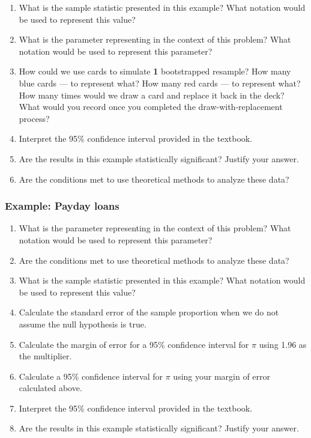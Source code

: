 \documentclass[
]{report}
\newcommand{\rgs}{\vspace{12pt}} %
\begin{document}
\begin{enumerate}
\def\labelenumi{\arabic{enumi}.}
\item
  What is the sample statistic presented in this example? What notation would be used to represent this value?
  \rgs
\item
  What is the parameter representing in the context of this problem? What notation would be used to represent this parameter?
  \rgs
\item
  How could we use cards to simulate \textbf{1} bootstrapped resample? How many blue cards --- to represent what? How many red cards --- to represent what? How many times would we draw a card and replace it back in the deck? What would you record once you completed the draw-with-replacement process?
  \rgs
  \rgs
\item
  Interpret the 95\% confidence interval provided in the textbook.
  \rgs
\item
  Are the results in this example statistically significant? Justify your answer.
  \rgs
\item
  Are the conditions met to use theoretical methods to analyze these data?
  \rgs
\end{enumerate}

\hypertarget{example-payday-loans-1}{%
\subsubsection*{Example: Payday loans}\label{example-payday-loans-1}}

\begin{enumerate}
\def\labelenumi{\arabic{enumi}.}
\item
  What is the parameter representing in the context of this problem? What notation would be used to represent this parameter?
  \rgs
\item
  Are the conditions met to use theoretical methods to analyze these data?
  \rgs
\item
  What is the sample statistic presented in this example? What notation would be used to represent this value?
  \rgs
\item
  Calculate the standard error of the sample proportion when we do not assume the null hypothesis is true.
  \rgs
\item
  Calculate the margin of error for a 95\% confidence interval for \(\pi\) using 1.96 as the multiplier.
  \rgs
\item
  Calculate a 95\% confidence interval for \(\pi\) using your margin of error calculated above.
  \rgs
\item
  Interpret the 95\% confidence interval provided in the textbook.
  \rgs
\item
  Are the results in this example statistically significant? Justify your answer.
  \rgs
\end{enumerate}
\end{document}
